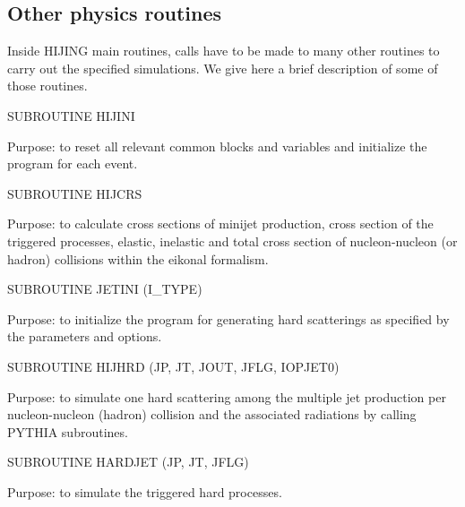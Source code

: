\subsection{Other physics routines}

        Inside HIJING main routines, calls have to be made to many other
routines to carry out the specified simulations. We give here a brief
description of some of those routines.

\begin{description}
\itemsep=-4.0pt
\item{}SUBROUTINE HIJINI
\item{}Purpose: to reset all relevant common blocks and variables and
        initialize the program for each event.
\end{description}

\begin{description}
\itemsep=-4.0pt
\item{}SUBROUTINE HIJCRS
\item{}Purpose: to calculate cross sections of minijet production,
        cross section of the triggered processes, 
        elastic, inelastic and total cross section of nucleon-nucleon
        (or hadron) collisions within the eikonal formalism.
\end{description}

\begin{description}
\itemsep=-4.0pt
\item{}SUBROUTINE JETINI (I\_TYPE)
\item{}Purpose: to initialize the program for generating hard scatterings
        as specified by the parameters and options.
\end{description}

\begin{description}
\itemsep=-4.0pt
\item{}SUBROUTINE HIJHRD (JP, JT, JOUT, JFLG, IOPJET0)
\item{}Purpose: to simulate one hard scattering among the multiple jet
        production per nucleon-nucleon (hadron) collision and the 
        associated radiations by calling PYTHIA subroutines.
\end{description}

\begin{description}
\itemsep=-4.0pt
\item{}SUBROUTINE HARDJET (JP, JT, JFLG)
\item{}Purpose: to simulate the triggered hard processes.
\end{description}

